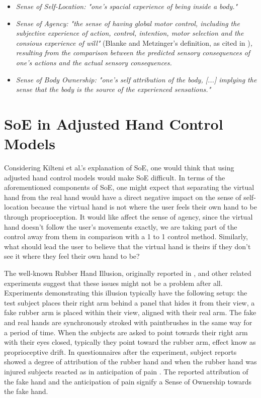 \begin{displayquote}
\begin{itemize}
\item \textit{Sense of Self-Location: "one's spacial experience of being inside a body."}
\item \textit{Sense of Agency: "the sense of having global motor control, including the subjective experience of action, control, intention, motor selection and the consious experience of will"} (Blanke and Metzinger's definition, as cited in \parencite{Kilteni2012})\textit{, resulting from the comparison between the predicted sensory consequences of one's actions and the actual sensory consequences.}
\item \textit{Sense of Body Ownership: "one's self attribution of the body, [...] implying the sense that the body is the source of the experienced sensations."}
\end{itemize}
\end{displayquote}

\section{SoE in Adjusted Hand Control Models}
\label{sec:rubberHandIllusion}

Considering Kilteni et al.'s explanation of SoE, one would think that using adjusted hand control models would make SoE difficult. In terms of the aforementioned components of SoE, one might expect that separating the virtual hand from the real hand would have a direct negative impact on the sense of self-location because the virtual hand is not where the user feels their own hand to be through proprioception. It would like affect the sense of agency, since the virtual hand doesn't follow the user's movements exactly, we are taking part of the control away from them in comparison with a 1 to 1 control method. Similarly, what should lead the user to believe that the virtual hand is theirs if they don't see it where they feel their own hand to be?

The well-known Rubber Hand Illusion, originally reported in \parencite{Botvinick1998}, and other related experiments suggest that these issues might not be a problem after all. Experiments demonstrating this illusion typically have the following setup: the test subject places their right arm behind a panel that hides it from their view, a fake rubber arm is placed within their view, aligned with their real arm. The fake and real hands are synchronously stroked with paintbrushes in the same way for a period of time. When the subjects are asked to point towards their right arm with their eyes closed, typically they point toward the rubber arm, effect know as proprioceptive drift. In questionnaires after the experiment, subject reports showed a degree of attribution of the rubber hand \parencite{Botvinick1998} and when the rubber hand was injured subjects reacted as in anticipation of pain \parencite{Armel2003}. The reported attribution of the fake hand and the anticipation of pain signify a Sense of Ownership towards the fake hand.

